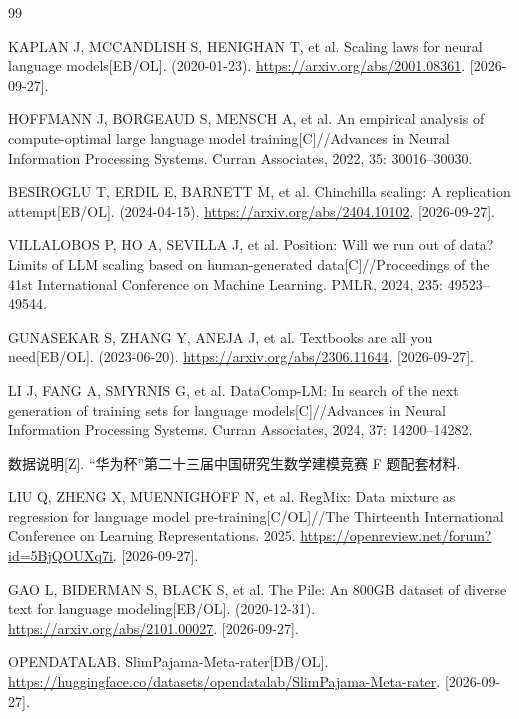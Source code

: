 \begin{thebibliography}{99}
\raggedright
\setlength{\emergencystretch}{2em}
\setlength{\itemsep}{4pt plus 1pt minus 1pt}

 KAPLAN J, MCCANDLISH S, HENIGHAN T, et al. Scaling laws for neural language models[EB/OL]. (2020-01-23). \url{https://arxiv.org/abs/2001.08361}. [2026-09-27].

 HOFFMANN J, BORGEAUD S, MENSCH A, et al. An empirical analysis of compute-optimal large language model training[C]//Advances in Neural Information Processing Systems. Curran Associates, 2022, 35: 30016--30030.

 BESIROGLU T, ERDIL E, BARNETT M, et al. Chinchilla scaling: A replication attempt[EB/OL]. (2024-04-15). \url{https://arxiv.org/abs/2404.10102}. [2026-09-27].

 VILLALOBOS P, HO A, SEVILLA J, et al. Position: Will we run out of data? Limits of LLM scaling based on human-generated data[C]//Proceedings of the 41st International Conference on Machine Learning. PMLR, 2024, 235: 49523--49544.

 GUNASEKAR S, ZHANG Y, ANEJA J, et al. Textbooks are all you need[EB/OL]. (2023-06-20). \url{https://arxiv.org/abs/2306.11644}. [2026-09-27].

 LI J, FANG A, SMYRNIS G, et al. DataComp-LM: In search of the next generation of training sets for language models[C]//Advances in Neural Information Processing Systems. Curran Associates, 2024, 37: 14200--14282.

 数据说明[Z]. “华为杯”第二十三届中国研究生数学建模竞赛 F 题配套材料.

 LIU Q, ZHENG X, MUENNIGHOFF N, et al. RegMix: Data mixture as regression for language model pre-training[C/OL]//The Thirteenth International Conference on Learning Representations. 2025. \url{https://openreview.net/forum?id=5BjQOUXq7i}. [2026-09-27].

 GAO L, BIDERMAN S, BLACK S, et al. The Pile: An 800GB dataset of diverse text for language modeling[EB/OL]. (2020-12-31). \url{https://arxiv.org/abs/2101.00027}. [2026-09-27].

 OPENDATALAB. SlimPajama-Meta-rater[DB/OL]. \url{https://huggingface.co/datasets/opendatalab/SlimPajama-Meta-rater}. [2026-09-27].


\end{thebibliography}
